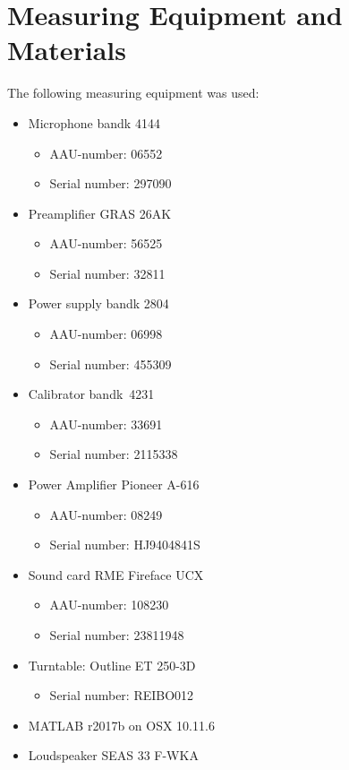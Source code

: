 \section*{Measuring Equipment and Materials}
The following measuring equipment was used:
\begin{itemize}[noitemsep]
\item Microphone \gls{bandk} 4144
\begin{itemize}[noitemsep]
\item AAU-number: 06552
\item Serial number: 297090
\end{itemize}
\item Preamplifier GRAS 26AK
\begin{itemize}[noitemsep]
\item AAU-number: 56525
\item Serial number: 32811
\end{itemize}
\item Power supply \gls{bandk} 2804
\begin{itemize}
\item AAU-number: 06998
\item Serial number: 455309
\end{itemize}
\item Calibrator \gls{bandk}\ 4231
\begin{itemize}[noitemsep]
\item AAU-number: 33691
\item Serial number: 2115338
\end{itemize}
\item Power Amplifier Pioneer A-616
\begin{itemize}[noitemsep]
\item AAU-number: 08249
\item Serial number: HJ9404841S
\end{itemize}
\item Sound card RME Fireface UCX
\begin{itemize}[noitemsep]
\item AAU-number: 108230
\item Serial number: 23811948
\end{itemize}
\item Turntable: Outline ET 250-3D
\begin{itemize}
\item Serial number: REIBO012
\end{itemize}
\item MATLAB r2017b on OSX 10.11.6
\item Loudspeaker SEAS 33 F-WKA
\end{itemize}

